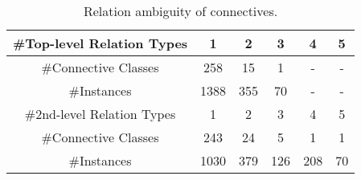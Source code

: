 \begin{table}[!htbp]
\centering
\begin{tabular}{|c|c|c|c|c|c|}
\hline
\#Top-level Relation Types & 1    & 2   & 3   & 4   & 5  \\ \hline
\#Connective Classes       & 258  & 15  & 1   & -   & -  \\ \hline
\#Instances                & 1388 & 355 & 70  & -   & -  \\

\hhline{|=|=|=|=|=|=|}

\#2nd-level Relation Types & 1    & 2   & 3   & 4   & 5  \\ \hline
\#Connective Classes       & 243  & 24  & 5   & 1   & 1  \\ \hline
\#Instances                & 1030 & 379 & 126 & 208 & 70 \\ \hline

\end{tabular}
\caption{\label{t:connective-type} Relation ambiguity of connectives. }
\end{table}
